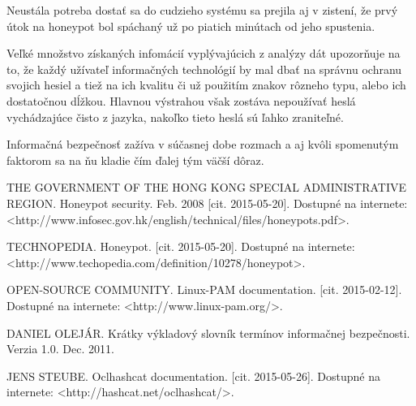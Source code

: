 \documentclass[12pt, oneside]{book}
\begin{document}
Neustála potreba dostať sa do cudzieho systému sa prejila aj v zistení, že prvý útok na honeypot bol spáchaný už po piatich minútach od jeho spustenia. 

Veľké množstvo získaných infomácií vyplývajúcich z analýzy dát upozorňuje na to, že každý užívateľ informačných technológií by mal dbať na správnu ochranu svojich hesiel a tiež na ich kvalitu či už použitím znakov rôzneho typu, alebo ich dostatočnou dĺžkou.
Hlavnou výstrahou však zostáva nepoužívať heslá vychádzajúce čisto z jazyka, nakoľko tieto heslá sú ľahko zraniteľné.

Informačná bezpečnosť zažíva v súčasnej dobe rozmach a aj kvôli spomenutým faktorom sa na ňu kladie čím ďalej tým väčší dôraz.




\newpage	

\backmatter

\thispagestyle{empty}
\nocite{*}
\clearpage


% 

\begin{thebibliography}{5}
 
 \uppercase{The Government of the Hong Kong Special Administrative Region}. Honeypot security.
Feb. 2008 
[cit. 2015-05-20].
Dostupné na internete: \textless http://www.infosec.gov.hk/english/technical/files/honeypots.pdf\textgreater .


 \uppercase{technopedia}. Honeypot.
[cit. 2015-05-20].
Dostupné na internete: \textless http://www.techopedia.com/definition/10278/honeypot\textgreater .

 \uppercase{Open-source community}. Linux-PAM documentation.
[cit. 2015-02-12].
Dostupné na internete: \textless http://www.linux-pam.org/\textgreater .

 \uppercase{Daniel Olejár}. Krátky výkladový slovník termínov informačnej bezpečnosti. Verzia 1.0. Dec. 2011.

 \uppercase{Jens Steube}. Oclhashcat documentation.
[cit. 2015-05-26].
Dostupné na internete: \textless http://hashcat.net/oclhashcat/\textgreater .

\end{thebibliography}

\end{document}

